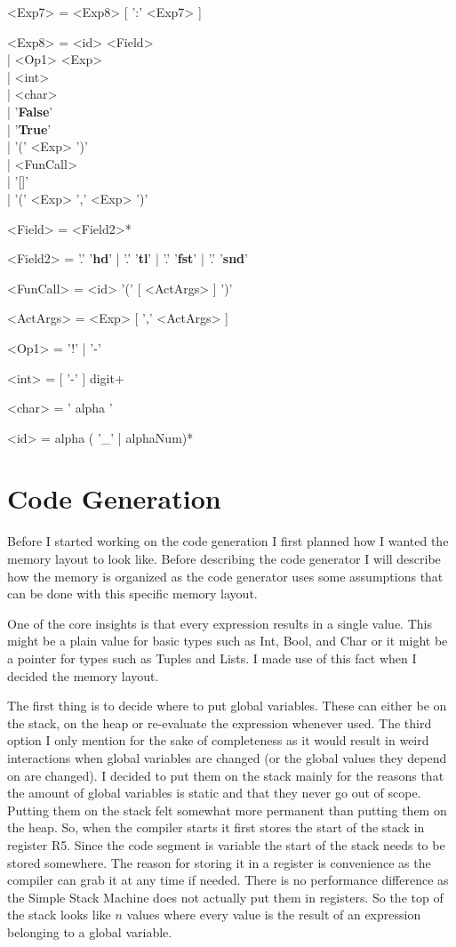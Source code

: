 \documentclass{article}
\begin{document}
\begin{grammar}
	<Exp7> = <Exp8> [ ':' <Exp7> ]

	<Exp8> = <id> <Field> \\| <Op1> <Exp> \\| <int> \\| <char> \\| '\textbf{False}' \\| '\textbf{True}' \\| '(' <Exp> ')' \\| <FunCall> \\| '[]' \\| '(' <Exp> ',' <Exp> ')'

	<Field> = <Field2>*

	<Field2> = '.' '\textbf{hd}' | '.' '\textbf{tl}' | '.' '\textbf{fst}' | '.' '\textbf{snd}'

	<FunCall> = <id> '(' [ <ActArgs> ] ')'

	<ActArgs> = <Exp> [ ',' <ActArgs> ]

	<Op1> = '!' | '-'

	<int> = [ '-' ] digit+

	<char> = ' alpha '

	<id> = alpha ( '\_' | alphaNum)*
\end{grammar}

\section{Code Generation}
Before I started working on the code generation I first planned how I wanted the memory layout to look like. Before describing the code generator I will describe how the memory is organized as the code generator uses some assumptions that can be done with this specific memory layout.

One of the core insights is that every expression results in a single value. This might be a plain value for basic types such as Int, Bool, and Char or it might be a pointer for types such as Tuples and Lists. I made use of this fact when I decided the memory layout.

The first thing is to decide where to put global variables. These can either be on the stack, on the heap or re-evaluate the expression whenever used. The third option I only mention for the sake of completeness as it would result in weird interactions when global variables are changed (or the global values they depend on are changed). I decided to put them on the stack mainly for the reasons that the amount of global variables is static and that they never go out of scope. Putting them on the stack felt somewhat more permanent than putting them on the heap. So, when the compiler starts it first stores the start of the stack in register R5. Since the code segment is variable the start of the stack needs to be stored somewhere. The reason for storing it in a register is convenience as the compiler can grab it at any time if needed. There is no performance difference as the Simple Stack Machine does not actually put them in registers. So the top of the stack looks like $n$ values where every value is the result of an expression belonging to a global variable.
\end{document}
